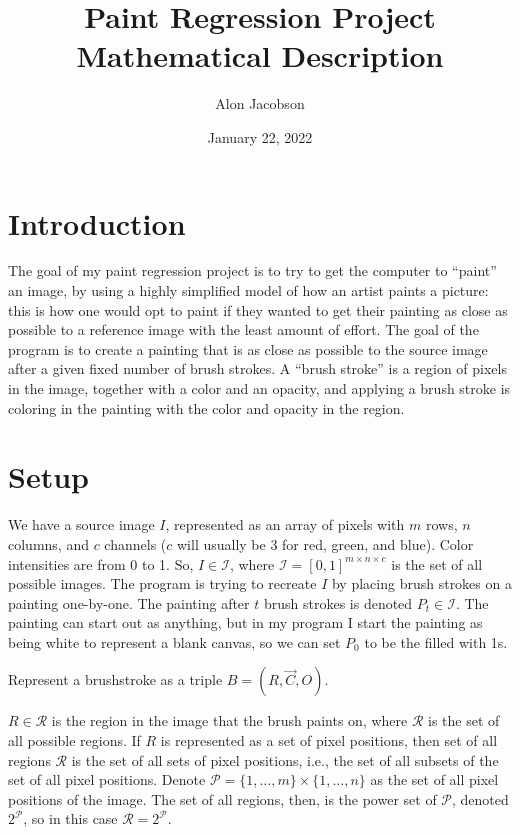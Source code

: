 \documentclass[12pt]{article}
\title{Paint Regression Project Mathematical Description}
\author{Alon Jacobson}
\date{January 22, 2022}
\begin{document}
\maketitle

\section{Introduction}
The goal of my paint regression project is to try to get the computer to ``paint'' an image, by using a highly simplified model of how an artist paints a picture: this is how one would opt to paint if they wanted to get their painting as close as possible to a reference image with the least amount of effort. The goal of the program is to create a painting that is as close as possible to the source image after a given fixed number of brush strokes. A ``brush stroke'' is a region of pixels in the image, together with a color and an opacity, and applying a brush stroke is coloring in the painting with the color and opacity in the region.


\section{Setup}
We have a source image $I$, represented as an array of pixels with $m$ rows, $n$ columns, and $c$ channels ($c$ will usually be 3 for red, green, and blue). Color intensities are from 0 to 1. So, $I \in \mathcal{I}$, where $\mathcal{I} = [0,1]^{m \times n \times c}$ is the set of all possible images. The program is trying to recreate $I$ by placing brush strokes on a painting  one-by-one. The painting after $t$ brush strokes is denoted $P_t \in \mathcal I$. The painting can start out as anything, but in my program I start the painting as being white to represent a blank canvas, so we can set $P_0$ to be the filled with 1s.

Represent a brushstroke as a triple $B = (R, \vec C, O)$. 

$R \in \mathcal{R}$ is the region in the image that the brush paints on, where $\mathcal{R}$ is the set of all possible regions. If $R$ is represented as a set of pixel positions, then set of all regions $\mathcal{R}$ is the set of all sets of pixel positions, i.e., the set of all subsets of the set of all pixel positions. Denote $\mathcal{P} = \{1,\dots,m\} \times \{1,\dots,n\}$ as the set of all pixel positions of the image. The set of all regions, then, is the power set of $\mathcal{P}$, denoted $2^\mathcal{P}$, so in this case $\mathcal{R} = 2^\mathcal{P}$.
\end{document}
